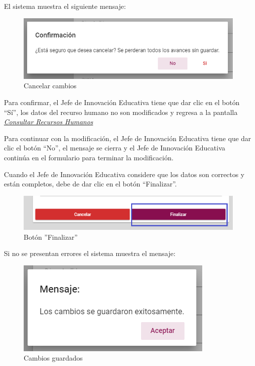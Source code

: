                 El sistema muestra el siguiente mensaje:
                  \clearpage
                 \begin{figure}[H]
                    \centering
                    \includegraphics[width=0.4\linewidth]{images/SP1/MSG29}
                    \caption{Cancelar cambios}
                    \label{mensaje29}

                \end{figure}

                Para confirmar, el Jefe de Innovación Educativa tiene que dar clic en el botón “Sí”, los datos del recurso humano no son modificados  y regresa a la pantalla \hyperlink{consultarRH}{\textit{Consultar Recursos Humanos}}

                Para continuar con la modificación, el Jefe de Innovación Educativa tiene que  dar clic el botón “No”, el mensaje se cierra y el Jefe de Innovación Educativa continúa en el formulario para terminar la modificación.

                Cuando el Jefe de Innovación Educativa considere que los datos son correctos y están completos, debe de dar clic en el botón “Finalizar”.
                \begin{figure}[H]
                    \centering
                    \hypertarget{btnfin}{\includegraphics[width=0.7\linewidth]{images/SP1/BtnFinalizar}}
                    \caption{Botón ''Finalizar''}
                    \label{btnfin}
                \end{figure}

                Si no se presentan errores el sistema muestra el mensaje:

                 \begin{figure}[H]
                    \centering
                    \includegraphics[width=0.4\linewidth]{images/SP1/MSG31}
                    \caption{Cambios guardados}
                    \label{mensaje31}

                \end{figure}

